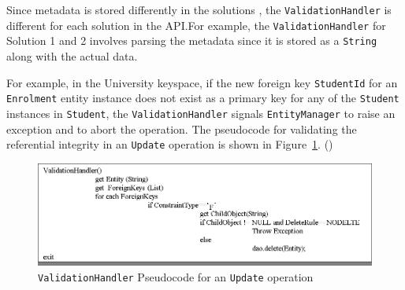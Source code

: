 		
		Since metadata is stored differently in the solutions , the
		\texttt{ValidationHandler} is different for each solution in the \ac{API}.For
		example,  the \texttt{ValidationHandler} for Solution 1 and 2 involves parsing
		the metadata since it is stored as a \texttt{String} along with the actual data.
		
		For example,  in the University keyspace, if
		the new foreign key \texttt{StudentId} for an \texttt{Enrolment} entity
		instance does not exist as a primary key for any of the \texttt{Student}
		instances in \texttt{Student},   the \texttt{ValidationHandler} signals
		\texttt{EntityManager} to raise an exception and to abort the operation.  The	pseudocode for validating the referential
		integrity in an \texttt{Update} operation is shown in
		Figure~\ref{f:VHpseudocode}. 
		() \begin{figure}[h]
			\centering
			\includegraphics[width=.8\textwidth]{./figure/Solutions/VH-UpdatePseudocode.png}
			\caption{\texttt{ValidationHandler} Pseudocode for an
			\texttt{Update} operation}\label{f:VHpseudocode}
		\end{figure}
		
		  
		
		
		
% 		
		
